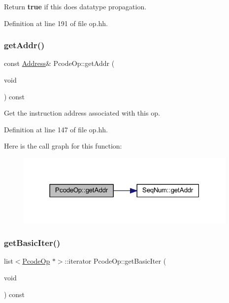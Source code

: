 Return {\bfseries{true}} if this does datatype propagation. 



Definition at line 191 of file op.\+hh.

\mbox{\label{class_pcode_op_a73fe9f0a388f65445e16fbb506af9234}} 
\subsubsection{\texorpdfstring{getAddr()}{getAddr()}}
{\footnotesize\ttfamily const \mbox{\hyperlink{class_address}{Address}}\& Pcode\+Op\+::get\+Addr (\begin{DoxyParamCaption}\item[{void}]{ }\end{DoxyParamCaption}) const\hspace{0.3cm}{\ttfamily [inline]}}



Get the instruction address associated with this op. 



Definition at line 147 of file op.\+hh.

Here is the call graph for this function\+:
\nopagebreak
\begin{figure}[H]
\begin{center}
\leavevmode
\includegraphics[width=307pt]{class_pcode_op_a73fe9f0a388f65445e16fbb506af9234_cgraph}
\end{center}
\end{figure}
\mbox{\label{class_pcode_op_ae59d236d1cfac522cbf5f61a9f184753}} 
\subsubsection{\texorpdfstring{getBasicIter()}{getBasicIter()}}
{\footnotesize\ttfamily list$<$\mbox{\hyperlink{class_pcode_op}{Pcode\+Op}} $\ast$$>$\+::iterator Pcode\+Op\+::get\+Basic\+Iter (\begin{DoxyParamCaption}\item[{void}]{ }\end{DoxyParamCaption}) const\hspace{0.3cm}{\ttfamily [inline]}}

